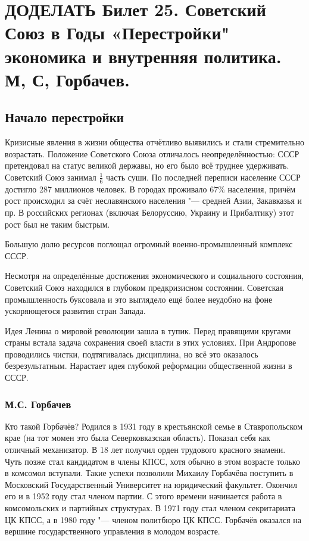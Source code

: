 \section{\textbf{ДОДЕЛАТЬ} Билет 25. Советский Союз в Годы «Перестройки" экономика и внутренняя политика. М, С, Горбачев.}

\subsection{Начало перестройки}

    Кризисные явления в жизни общества отчётливо выявились и стали стремительно возрастать. Положение Советского Союза отличалось неопределённостью: СССР претендовал на статус великой державы, но его было всё труднее удерживать. Советский Союз занимал $\frac{1}{6}$ часть суши. По последней переписи население СССР достигло 287 миллионов человек. В городах проживало $67\%$ населения, причём рост происходил за счёт неславянского населения "--- средней Азии, Закавказья и пр. В российских регионах (включая Белоруссию, Украину и Прибалтику) этот рост был не таким быстрым.
    
    Большую долю ресурсов поглощал огромный военно-промышленный комплекс СССР.
    
    Несмотря на определённые достижения экономического и социального состояния, Советский Союз находился в глубоком предкризисном состоянии. Советская промышленность буксовала и это выглядело ещё более неудобно на фоне ускоряющегося развития стран Запада.
    
    Идея Ленина о мировой революции зашла в тупик. Перед правящими кругами страны встала задача сохранения своей власти в этих условиях. При Андропове проводились чистки, подтягивалась дисциплина, но всё это оказалось безрезультатным. Нарастает идея глубокой реформации общественной жизни в СССР.

    \subsubsection{М.С. Горбачев}
    Кто такой Горбачёв? Родился в 1931 году в крестьянской семье в Ставропольском крае (на тот момен это была Северковказская область). Показал себя как отличный механизатор. В 18 лет получил орден трудового красного знамени. Чуть позже стал кандидатом в члены КПСС, хотя обычно в этом возрасте только в комсомол вступали. Такие успехи позволили Михаилу Горбачёва поступить в Московский Государственный Университет на юридический факультет. Окончил его и в 1952 году стал членом партии. С этого времени начинается работа в комсомольских и партийных структурах. В 1971 году стал членом секритариата ЦК КПСС, а в 1980 году "--- членом политбюро ЦК КПСС. Горбачёв оказался на вершине государственного управления в молодом возрасте.
    
